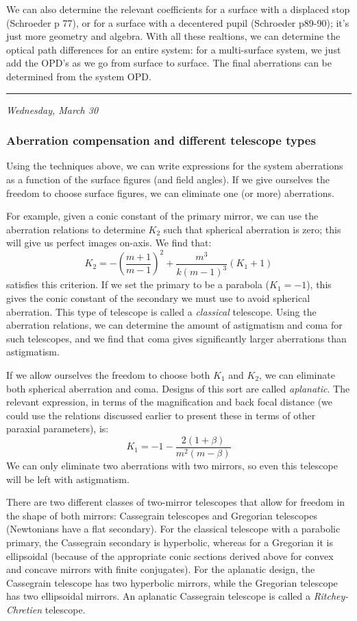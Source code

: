 \documentclass[12pt]{article}
\newcommand{\mydate}[1]{
    \begin{flushright}
        \rule{\textwidth}{0.4pt} %
        \small\hfill\textit{#1}
    \end{flushright}}
\begin{document}
We can also determine the relevant coefficients for a surface with a displaced
stop (Schroeder p 77), or for a surface with a decentered pupil (Schroeder
p89-90); it's just more geometry and algebra. With all these realtions, we can
determine the optical path differences for an entire system: for a
multi-surface system, we just add the OPD's as we go from surface to surface.
The final aberrations can be determined from the system OPD.

\mydate{Wednesday, March 30}
\subsubsection{Aberration compensation and different telescope types}
Using the techniques above, we can write expressions for the system
aberrations as a function of the surface figures (and field angles).
If we give ourselves the freedom to choose surface figures, we can
eliminate one (or more) aberrations.

For example, given a conic constant of the primary mirror, we can use
the aberration relations to determine $K_{2}$ such that spherical
aberration is zero; this will give us perfect images on-axis. We find
that:
\[
    K_{2} =
    - \left( \frac{m+1}{m-1} \right) ^{2}
    + \frac{m^{3}}{k \left( m - 1 \right) ^{3}} \left( K_{1} + 1 \right)
    \]
satisfies this criterion.  If we set the primary to be a parabola ($K_{1} =
-1$), this gives the conic constant of the secondary we must use to avoid
spherical aberration. This type of telescope is called a \textit{classical}
telescope. Using the aberration relations, we can determine the amount of
astigmatism and coma for such telescopes, and we find that coma gives
significantly larger aberrations than astigmatism.

If we allow ourselves the freedom to choose both $K_{1}$ and $K_{2}$, we can
eliminate both spherical aberration and coma. Designs of this sort are called
\textit{aplanatic}. The relevant expression, in terms of the magnification and
back focal distance (we could use the relations discussed earlier to present
these in terms of other paraxial parameters), is:
\[
    K_{1} = -1 - \frac{2(1+\beta)}{m^{2}(m-\beta)}
    \]
We can only eliminate two aberrations with two mirrors, so even this
telescope will be left with astigmatism.

There are two different classes of two-mirror telescopes that allow
for freedom in the shape of both mirrors: Cassegrain telescopes and
Gregorian telescopes (Newtonians have a flat secondary). For the
classical telescope with a parabolic primary, the Cassegrain
secondary is hyperbolic, whereas for a Gregorian it is ellipsoidal
(because of the appropriate conic sections derived above for convex
and concave mirrors with finite conjugates). For the aplanatic
design, the Cassegrain telescope has two hyperbolic mirrors, while
the Gregorian telescope has two ellipsoidal mirrors. An aplanatic
Cassegrain telescope is called a \textit{Ritchey-Chretien} telescope.
\end{document}
